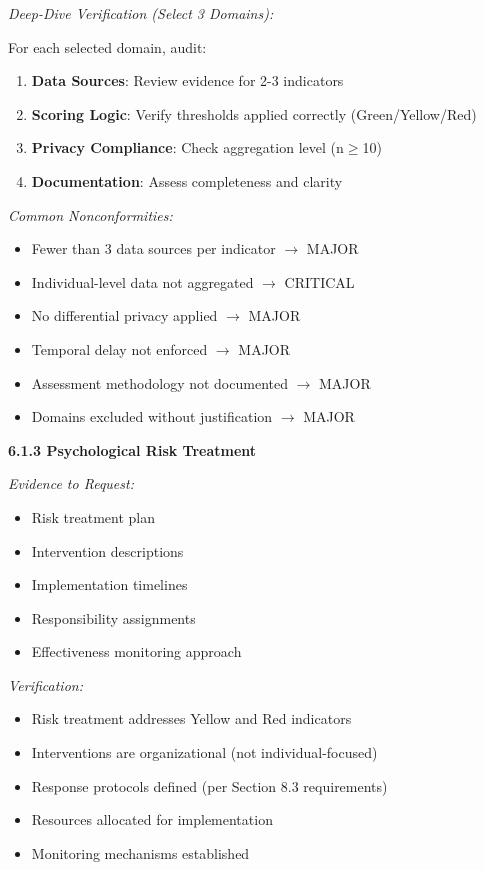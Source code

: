 \documentclass[11pt,a4paper]{article}
\begin{document}
\textit{Deep-Dive Verification (Select 3 Domains):}

For each selected domain, audit:
\begin{enumerate}
\item \textbf{Data Sources}: Review evidence for 2-3 indicators
\item \textbf{Scoring Logic}: Verify thresholds applied correctly (Green/Yellow/Red)
\item \textbf{Privacy Compliance}: Check aggregation level (n$\geq$10)
\item \textbf{Documentation}: Assess completeness and clarity
\end{enumerate}

\textit{Common Nonconformities:}
\begin{itemize}
\item Fewer than 3 data sources per indicator $\rightarrow$ MAJOR
\item Individual-level data not aggregated $\rightarrow$ CRITICAL
\item No differential privacy applied $\rightarrow$ MAJOR
\item Temporal delay not enforced $\rightarrow$ MAJOR
\item Assessment methodology not documented $\rightarrow$ MAJOR
\item Domains excluded without justification $\rightarrow$ MAJOR
\end{itemize}

\textbf{6.1.3 Psychological Risk Treatment}

\textit{Evidence to Request:}
\begin{itemize}
\item Risk treatment plan
\item Intervention descriptions
\item Implementation timelines
\item Responsibility assignments
\item Effectiveness monitoring approach
\end{itemize}

\textit{Verification:}
\begin{itemize}
\item Risk treatment addresses Yellow and Red indicators
\item Interventions are organizational (not individual-focused)
\item Response protocols defined (per Section 8.3 requirements)
\item Resources allocated for implementation
\item Monitoring mechanisms established
\end{itemize}
\end{document}
